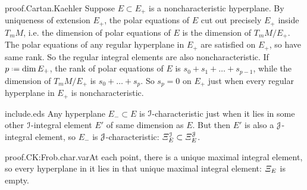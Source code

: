 \begin{answer}{proof.Cartan.Kaehler}
Suppose \(E\subset E_+\) is a noncharacteristic hyperplane.
By uniqueness of extension \(E_+\), the polar equations of \(E\) cut out precisely \(E_+\) inside \(T_m M\), i.e. the dimension of polar equations of \(E\) is the dimension of \(T_m M/E_+\).
The polar equations of any regular hyperplane in \(E_+\) are satisfied on \(E_+\), so have same rank.
So the regular integral elements are also noncharacteristic.
If \(p\defeq\dim E_+\), the rank of polar equations of \(E\) is \(s_0+s_1+\dots+s_{p-1}\), while the dimension of \(T_m M/E_+\) is \(s_0+\dots+s_p\).
So \(s_p=0\) on \(E_+\) just when every regular hyperplane in \(E_+\) is noncharacteristic.
\end{answer}
%
\begin{answer}{include.eds}%
Any hyperplane \(E_- \subset E\) is \(\mathcal{I}\)-characteristic just when it lies in some other \(\mathcal{I}\)-integral element \(E'\) of same dimension as \(E\). But then \(E'\) is also a \(\mathcal{J}\)-integral element, so \(E_-\) is \(\mathcal{J}\)-characteristic: \(\CV^{\II}_E\subset \CV^{\JJ}_E\).%
\end{answer}
\begin{answer}{proof.CK:Frob.char.var}At each point, there is a unique maximal integral element, so every hyperplane in it lies in that unique maximal integral element: \(\CV_E\) is empty.
\end{answer}

